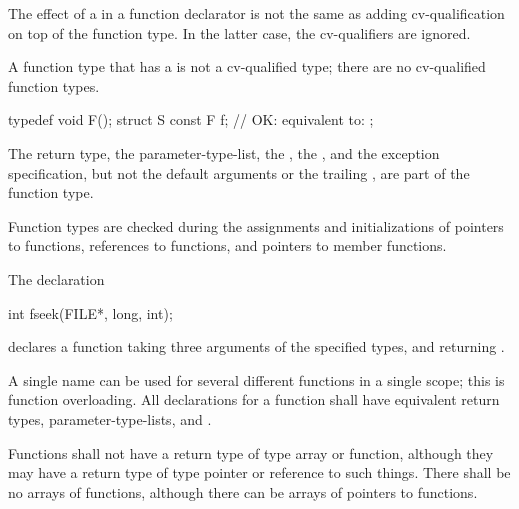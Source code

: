 \pnum
The effect of a
in a function declarator is not the same as
adding cv-qualification on top of the function type.
In the latter case, the cv-qualifiers are ignored.
\begin{note} A function type that has a  is not a
cv-qualified type; there are no cv-qualified function types. \end{note}
\begin{example}

\begin{codeblock}
typedef void F();
struct S {
  const F f;        // OK: equivalent to: 
};
\end{codeblock}
\end{example}

\pnum
The return type, the parameter-type-list, the ,
the , and
the exception specification,
but not the default arguments
or the trailing ,
are part of the function type.
\begin{note}
Function types are checked during the assignments and initializations of
pointers to functions, references to functions, and pointers to member functions.
\end{note}

\pnum
\begin{example}
The declaration

\begin{codeblock}
int fseek(FILE*, long, int);
\end{codeblock}

declares a function taking three arguments of the specified types,
and returning
.
\end{example}

\pnum
{}%
A single name can be used for several different functions in a single scope;
this is function overloading.
All declarations for a function shall have equivalent return types,
parameter-type-lists, and .

\pnum
{}%
%
Functions shall not have a return type of type array or function,
although they may have a return type of type pointer or reference to such things.
There shall be no arrays of functions, although there can be arrays of pointers
to functions.


